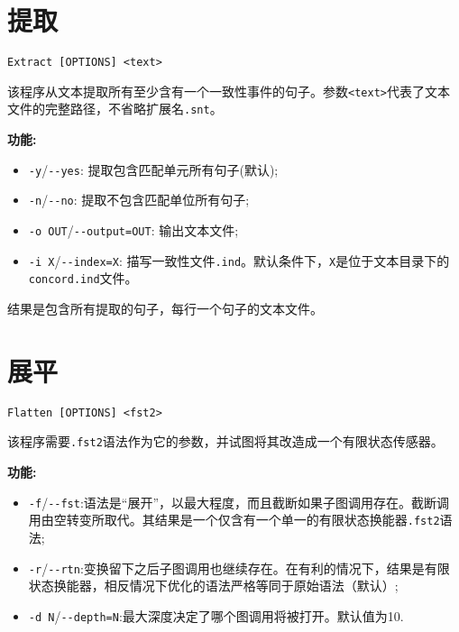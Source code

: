 \section{提取}
\verb+Extract [OPTIONS] <text>+

\bigskip
\noindent 该程序从文本提取所有至少含有一个一致性事件的句子。参数\verb+<text>+代表了文本文件的完整路径，不省略扩展名\verb+.snt+。

\bigskip
\noindent \textbf{功能:}
\begin{itemize}
\item \verb+-y+/\verb+--yes+: 提取包含匹配单元所有句子(默认);
\item \verb+-n+/\verb+--no+: 提取不包含匹配单位所有句子;
  \item \verb+-o OUT+/\verb+--output=OUT+: 输出文本文件;
  \item \verb+-i X+/\verb+--index=X+: 描写一致性文件\verb+.ind+。默认条件下，\verb+X+是位于文本目录下的\verb+concord.ind+文件。
\end{itemize}

\bigskip
\noindent 结果是包含所有提取的句子，每行一个句子的文本文件。








\section{展平}
\verb+Flatten [OPTIONS] <fst2>+

\bigskip
\noindent 该程序需要\verb+.fst2+语法作为它的参数，并试图将其改造成一个有限状态传感器。


\bigskip
\noindent \textbf{功能:}
\begin{itemize}
\item \verb+-f+/\verb+--fst+:语法是“展开”，以最大程度，而且截断如果子图调用存在。截断调用由空转变所取代。其结果是一个仅含有一个单一的有限状态换能器\verb+.fst2+语法; 

\item \verb+-r+/\verb+--rtn+:变换留下之后子图调用也继续存在。在有利的情况下，结果是有限状态换能器，相反情况下优化的语法严格等同于原始语法（默认）;

\item \verb+-d N+/\verb+--depth=N+:最大深度决定了哪个图调用将被打开。默认值为10.
\end{itemize}







